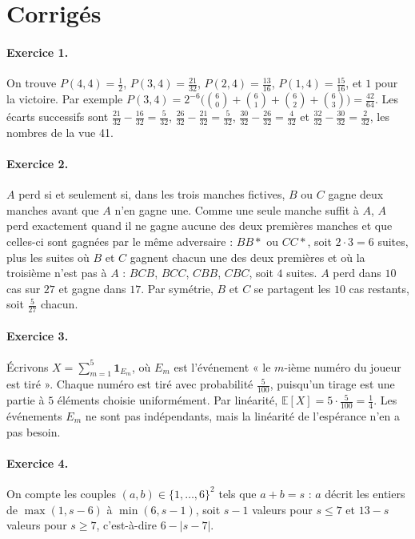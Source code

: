 \documentclass[11pt,a4paper]{article}
\theoremstyle{plain}
\theoremstyle{definition}
\theoremstyle{remark}
\newcommand{\E}{\mathbb{E}}
\begin{document}
\section{Corrigés}

\paragraph{Exercice 1.} On trouve $P(4,4)=\frac12$, $P(3,4)=\frac{21}{32}$, $P(2,4)=\frac{13}{16}$, $P(1,4)=\frac{15}{16}$, et $1$ pour la victoire. Par exemple $P(3,4)=2^{-6}\big(\binom60+\binom61+\binom62+\binom63\big)=\frac{42}{64}$. Les écarts successifs sont $\frac{21}{32}-\frac{16}{32}=\frac5{32}$, $\frac{26}{32}-\frac{21}{32}=\frac5{32}$, $\frac{30}{32}-\frac{26}{32}=\frac4{32}$ et $\frac{32}{32}-\frac{30}{32}=\frac2{32}$, les nombres de la vue 41.

\paragraph{Exercice 2.} $A$ perd si et seulement si, dans les trois manches fictives, $B$ ou $C$ gagne deux manches avant que $A$ n'en gagne une. Comme une seule manche suffit à $A$, $A$ perd exactement quand il ne gagne aucune des deux premières manches et que celles-ci sont gagnées par le même adversaire : $BB\ast$ ou $CC\ast$, soit $2\cdot3=6$ suites, plus les suites où $B$ et $C$ gagnent chacun une des deux premières et où la troisième n'est pas à $A$ : $BCB$, $BCC$, $CBB$, $CBC$, soit $4$ suites. $A$ perd dans $10$ cas sur $27$ et gagne dans $17$. Par symétrie, $B$ et $C$ se partagent les $10$ cas restants, soit $\frac5{27}$ chacun.

\paragraph{Exercice 3.} Écrivons $X=\sum_{m=1}^5\mathbf 1_{E_m}$, où $E_m$ est l'événement « le $m$-ième numéro du joueur est tiré ». Chaque numéro est tiré avec probabilité $\frac5{100}$, puisqu'un tirage est une partie à $5$ éléments choisie uniformément. Par linéarité, $\E[X]=5\cdot\frac5{100}=\frac14$. Les événements $E_m$ ne sont pas indépendants, mais la linéarité de l'espérance n'en a pas besoin.

\paragraph{Exercice 4.} On compte les couples $(a,b)\in\{1,\dots,6\}^2$ tels que $a+b=s$ : $a$ décrit les entiers de $\max(1,s-6)$ à $\min(6,s-1)$, soit $s-1$ valeurs pour $s\leq7$ et $13-s$ valeurs pour $s\geq7$, c'est-à-dire $6-|s-7|$.
\end{document}
